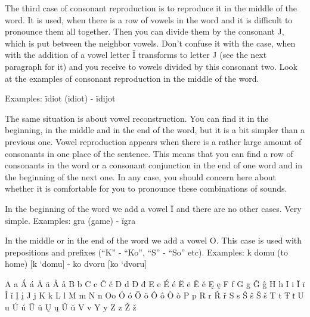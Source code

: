 The third case of consonant reproduction is to reproduce it in the middle of the word. It is used, when there is a row of vowels in the word and it is difficult to pronounce them all together. Then you can divide them by the consonant J, which is put between the neighbor vowels. Don’t confuse it with the case, when with the addition of a vowel letter Ǐ transforms to letter J (see the next paragraph for it) and you receive to vowels divided by this consonant two. Look at the examples of consonant reproduction in the middle of the word.

Examples:
ïdiot (idiot) \textipa{[idI’ot]} - ïdijot 

The same situation is about vowel reconstruction. You can find it in the beginning, in the middle and in the end of the word, but it is a bit simpler than a previous one. Vowel reproduction appears when there is a rather large amount of consonants in one place of the sentence. This means that you can find a row of consonants in the word or a consonant conjunction in the end of one word and in the beginning of the next one. In any case, you should concern here about whether it is comfortable for you to pronounce these combinations of sounds.

In the beginning of the word we add a vowel Ï and there are no other cases. Very simple.
Examples:
gra (game) \textipa{[Hra]} - ïgra \textipa{[i’Hra]}

In the middle or in the end of the word we add a vowel O. This case is used with prepositions and prefixes (“K” - “Ko”, “S” - “So” etc). 
Examples:
k domu (to home) [k ‘domu] - ko dvoru [ko ‘dvoru]

A
a
Á
á
Ä
ä
Å
å
B
b
C
c
Č
č
D
d
Đ
đ
E
e
É
é
Ë
ë
Ě
ě
Ę
ę
F
f
G
g
Ĝ
ĝ
H
h
I
i
Ï
ï
Ǐ
ǐ
Į
į
J
j
K
k
L
l
M
m
N
n
Oo
Ó
ó
Ö
ö
Ô
ô
Ò
ò
P
p
R
r
Ř
ř
S
s
Ŝ
ŝ
Š
š
T
t
Ŧ
ŧ
U
u
Ú
ú
Ü
ü
Ų
ų
Ŭ
ŭ
V
v
Y
y
Z
z
Ž
ž





